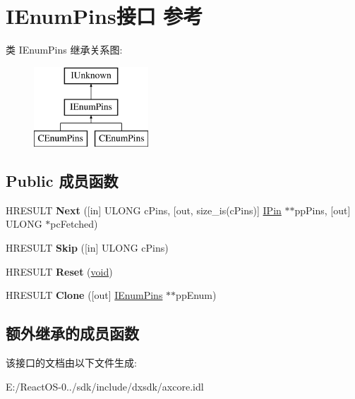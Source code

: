 \hypertarget{interface_i_enum_pins}{}\section{I\+Enum\+Pins接口 参考}
\label{interface_i_enum_pins}
类 I\+Enum\+Pins 继承关系图\+:\begin{figure}[H]
\begin{center}
\leavevmode
\includegraphics[height=3.000000cm]{interface_i_enum_pins}
\end{center}
\end{figure}
\subsection*{Public 成员函数}
\begin{DoxyCompactItemize}
\item 
\mbox{\label{interface_i_enum_pins_a03f2e8632f40c17b08ba365934612731}} 
H\+R\+E\+S\+U\+LT {\bfseries Next} (\mbox{[}in\mbox{]} U\+L\+O\+NG c\+Pins, \mbox{[}out, size\+\_\+is(c\+Pins)\mbox{]} \hyperlink{interface_i_pin}{I\+Pin} $\ast$$\ast$pp\+Pins, \mbox{[}out\mbox{]} U\+L\+O\+NG $\ast$pc\+Fetched)
\item 
\mbox{\label{interface_i_enum_pins_a10b033465db31f51112d6665da6e50cf}} 
H\+R\+E\+S\+U\+LT {\bfseries Skip} (\mbox{[}in\mbox{]} U\+L\+O\+NG c\+Pins)
\item 
\mbox{\label{interface_i_enum_pins_ab16bcb4db585b52cf2d09abb36022f98}} 
H\+R\+E\+S\+U\+LT {\bfseries Reset} (\hyperlink{interfacevoid}{void})
\item 
\mbox{\label{interface_i_enum_pins_afa15ba43ccfa0f15e8974277492c4bf8}} 
H\+R\+E\+S\+U\+LT {\bfseries Clone} (\mbox{[}out\mbox{]} \hyperlink{interface_i_enum_pins}{I\+Enum\+Pins} $\ast$$\ast$pp\+Enum)
\end{DoxyCompactItemize}
\subsection*{额外继承的成员函数}


该接口的文档由以下文件生成\+:\begin{DoxyCompactItemize}
\item 
E\+:/\+React\+O\+S-\/0../sdk/include/dxsdk/axcore.\+idl\end{DoxyCompactItemize}
